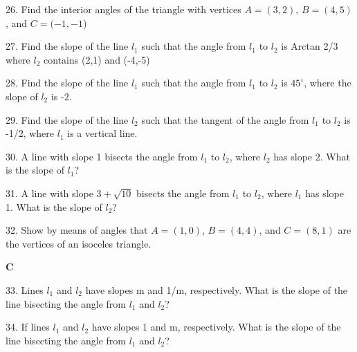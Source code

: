 \documentclass[10pt,letterpaper]{article}
\begin{document}
26. Find the interior angles of the triangle with vertices $A=(3,2)$, $B=(4,5)$, and $C=(-1,-1$)

27. Find the slope of the line $l_1$ such that the angle from $l_1$ to $l_2$ is Arctan 2/3 where $l_2$ contains (2,1) and (-4,-5)

28. Find the slope of the line $l_1$ such that the angle from $l_1$ to $l_2$ is $45^{\circ}$, where the slope of $l_2$ is -2.

29. Find the slope of the line $l_2$ such that the tangent of the angle from $l_1$ to $l_2$ is -1/2, where $l_1$ is a vertical line.

30. A line with slope 1 bisects the angle from $l_1$ to $l_2$, where $l_2$ has slope 2. What is the slope of $l_1$?

31. A line with slope $3 + \sqrt{10}$ bisects the angle from $l_1$ to $l_2$, where $l_1$ has slope 1. What is the slope of $l_2$?

32. Show by means of angles that $A=(1,0)$, $B=(4,4)$, and $C=(8,1)$ are the vertices of an isoceles triangle.

\medskip
\textbf{C}
\medskip

33. Lines $l_1$ and $l_2$ have slopes m and 1/m, respectively. What is the slope of the line bisecting the angle from $l_1$ and $l_2$?

34. If lines $l_1$ and $l_2$ have slopes 1 and m, respectively. What is the slope of the line bisecting the angle from $l_1$ and $l_2$?
\end{document}
